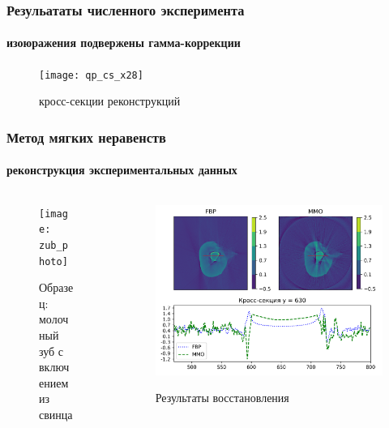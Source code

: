 \begin{frame}
\frametitle{Резульататы численного эксперимента}
\framesubtitle{изоюражения подвержены гамма-коррекции}

\begin{figure}
  \centering
  \texttt{[image: qp\_cs\_x28]}
  \caption{кросс-секции реконструкций}
  \label{fig:sample}
\end{figure}

\end{frame}


\begin{frame}
\frametitle{Метод мягких неравенств}
\framesubtitle{реконструкция экспериментальных данных}

\centering
\vspace{-0.3cm}
\begin{columns}
\vspace{-1.2cm}
\begin{column}{0.3\textwidth}
\begin{figure}
    \texttt{[image: zub\_photo]}
    \caption{Образец: молочный зуб с включением из свинца}
\end{figure}
\end{column}

\begin{column}{0.85\textwidth}
\vspace{-0.3cm}
\begin{figure}
    \centering
    \includegraphics[width=\textwidth]{../Dissertation/images/part2_img/pb_big__fbp_vs_soft__cs__viridis} \\

    \caption{Результаты восстановления}
    \label{fig:fbp_vs_soft__zub}
\end{figure}
\end{column}
\end{columns}

\end{frame}

